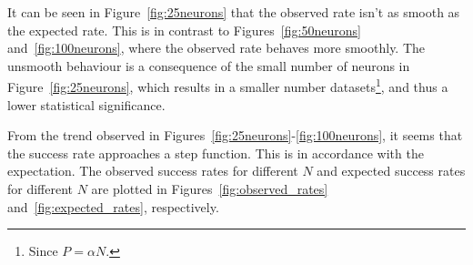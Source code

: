 It can be seen in Figure~\ref{fig:25neurons} that the observed rate isn't as smooth as the expected rate.
This is in contrast to Figures~\ref{fig:50neurons} and~\ref{fig:100neurons}, where the observed rate behaves more smoothly.
The unsmooth behaviour is a consequence of the small number of neurons in Figure~\ref{fig:25neurons}, which results in a smaller number datasets\footnote{Since \(P = \alpha N\).}, and thus a lower statistical significance.

From the trend observed in Figures~\ref{fig:25neurons}-\ref{fig:100neurons}, it seems that the success rate approaches a step function.
This is in accordance with the expectation.
The observed success rates for different \(N\) and expected success rates for different \(N\) are plotted in Figures~\ref{fig:observed_rates} and~\ref{fig:expected_rates}, respectively.


